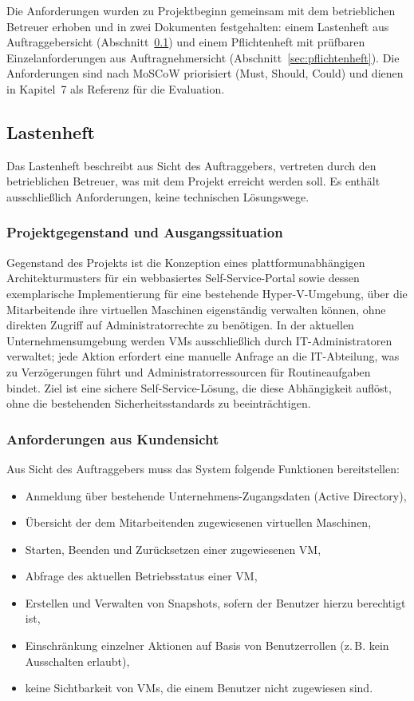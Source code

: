 \documentclass[12pt,a4paper]{article}
\begin{document}
Die Anforderungen wurden zu Projektbeginn gemeinsam mit dem betrieblichen Betreuer erhoben und in zwei Dokumenten festgehalten: einem Lastenheft aus Auftraggebersicht (Abschnitt~\ref{sec:lastenheft}) und einem Pflichtenheft mit prüfbaren Einzelanforderungen aus Auftragnehmersicht (Abschnitt~\ref{sec:pflichtenheft}). Die Anforderungen sind nach MoSCoW priorisiert (Must, Should, Could) und dienen in Kapitel~7 als Referenz für die Evaluation.

\subsection{Lastenheft}
\label{sec:lastenheft}

Das Lastenheft beschreibt aus Sicht des Auftraggebers, vertreten durch den betrieblichen Betreuer, was mit dem Projekt erreicht werden soll. Es enthält ausschließlich Anforderungen, keine technischen Lösungswege.

\subsubsection{Projektgegenstand und Ausgangssituation}

Gegenstand des Projekts ist die Konzeption eines plattformunabhängigen Architekturmusters für ein webbasiertes Self-Service-Portal sowie dessen exemplarische Implementierung für eine bestehende Hyper-V-Umgebung, über die Mitarbeitende ihre virtuellen Maschinen eigenständig verwalten können, ohne direkten Zugriff auf Administratorrechte zu benötigen. In der aktuellen Unternehmensumgebung werden VMs ausschließlich durch IT-Administratoren verwaltet; jede Aktion erfordert eine manuelle Anfrage an die IT-Abteilung, was zu Verzögerungen führt und Administratorressourcen für Routineaufgaben bindet. Ziel ist eine sichere Self-Service-Lösung, die diese Abhängigkeit auflöst, ohne die bestehenden Sicherheitsstandards zu beeinträchtigen.

\subsubsection{Anforderungen aus Kundensicht}

Aus Sicht des Auftraggebers muss das System folgende Funktionen bereitstellen:

\begin{itemize}
  \item Anmeldung über bestehende Unternehmens-Zugangsdaten (Active Directory),
  \item Übersicht der dem Mitarbeitenden zugewiesenen virtuellen Maschinen,
  \item Starten, Beenden und Zurücksetzen einer zugewiesenen VM,
  \item Abfrage des aktuellen Betriebsstatus einer VM,
  \item Erstellen und Verwalten von Snapshots, sofern der Benutzer hierzu berechtigt ist,
  \item Einschränkung einzelner Aktionen auf Basis von Benutzerrollen (z.\,B. kein Ausschalten erlaubt),
  \item keine Sichtbarkeit von VMs, die einem Benutzer nicht zugewiesen sind.
\end{itemize}
\end{document}
